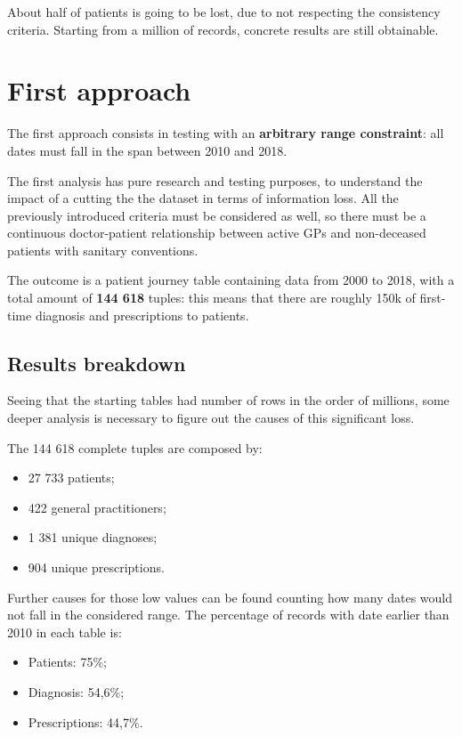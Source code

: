 About half of patients is going to be lost, due to not respecting the consistency criteria. Starting from a million of records, concrete results are still obtainable.

\section{First approach}
The first approach consists in testing with an \textbf{arbitrary range constraint}: all dates must fall in the span between 2010 and 2018.

The first analysis has pure research and testing purposes, to understand the impact of a cutting the the dataset in terms of information loss. All the previously introduced criteria must be considered as well, so there must be a continuous doctor-patient relationship between active GPs and non-deceased patients with sanitary conventions.

The outcome is a patient journey table containing data from 2000 to 2018, with a total amount of \textbf{144 618} tuples: this means that there are roughly 150k of first-time diagnosis and prescriptions to patients. 

\subsection{Results breakdown}
Seeing that the starting tables had number of rows in the order of millions, some deeper analysis is necessary to figure out the causes of this significant loss.

The 144 618 complete tuples are composed by:
\begin{itemize}
	\item 27 733 patients;
	\item 422 general practitioners;
	\item 1 381 unique diagnoses;
	\item 904 unique prescriptions.
\end{itemize}

Further causes for those low values can be found counting how many dates would not fall in the considered range. The percentage of records with date earlier than 2010 in each table is:
\begin{itemize}
	\item Patients: 75\%;
	\item Diagnosis: 54,6\%;
	\item Prescriptions: 44,7\%.
\end{itemize}

